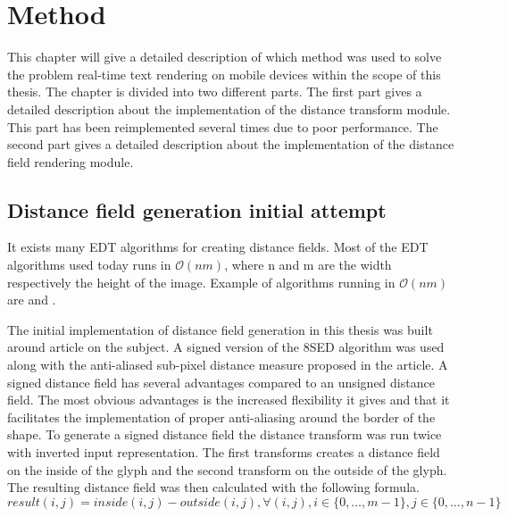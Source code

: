 \chapter{Method}\label{cha:method}
This chapter will give a detailed description of which method was used to solve the problem real-time text rendering on mobile devices within the scope of this thesis. The chapter is divided into two different parts. The first part gives a detailed description about the implementation of the distance transform module. This part has been reimplemented several times due to poor performance. The second part gives a detailed description about the implementation of the distance field rendering module.

\section{Distance field generation initial attempt}
It exists many EDT algorithms for creating distance fields. Most of the EDT algorithms used today runs in $\mathcal{O}(nm)$, where n and m are the width respectively the height of the image. Example of algorithms running in $\mathcal{O}(nm)$ are \citet{Danielsson} and \citet{meijster}.

The initial implementation of distance field generation in this thesis was built around \citet{Gustavson:2011} article on the subject. A signed version of the 8SED algorithm was used along with the anti-aliased sub-pixel distance measure proposed in the article. A signed distance field has several advantages compared to an unsigned distance field. The most obvious advantages is the increased flexibility it gives and that it facilitates the implementation of proper anti-aliasing around the border of the shape\citep{gustavson20122d}. To generate a signed distance field the distance transform was run twice with inverted input representation. The first transforms creates a distance field on the inside of the glyph and the second transform on the outside of the glyph. The resulting distance field was then calculated with the following formula.\vspace{\baselineskip}\newline
$result(i,j) = inside(i,j) - outside(i,j), \forall (i, j), i \in \{0,\dots, m-1\}, j \in \{0,\dots, n-1\}$ \vspace{\baselineskip}\newline
